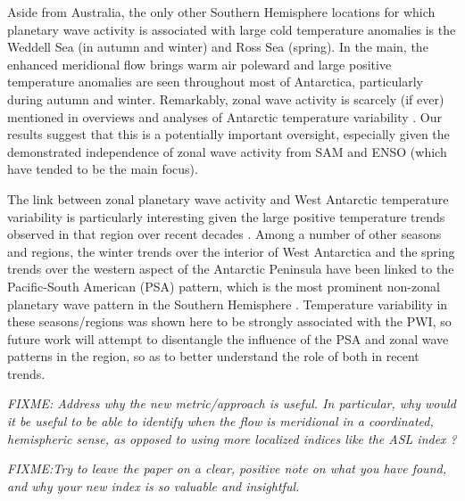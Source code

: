 Aside from Australia, the only other Southern Hemisphere locations for which planetary wave activity is associated with large cold temperature anomalies is the Weddell Sea (in autumn and winter) and Ross Sea (spring). In the main, the enhanced meridional flow brings warm air poleward and large positive temperature anomalies are seen throughout most of Antarctica, particularly during autumn and winter. Remarkably, zonal wave activity is scarcely (if ever) mentioned in overviews and analyses of Antarctic temperature variability \citep[e.g.][]{Russell2010,SchneiderOkumura2012,Yu2012}. Our results suggest that this is a potentially important oversight, especially given the demonstrated independence of zonal wave activity from SAM and ENSO (which have tended to be the main focus).   

The link between zonal planetary wave activity and West Antarctic temperature variability is particularly interesting given the large positive temperature trends observed in that region over recent decades \citep[e.g.][]{Bromwich2013}. Among a number of other seasons and regions, the winter trends over the interior of West Antarctica \citep{Ding2011} and the spring trends over the western aspect of the Antarctic Peninsula \citep{Ding2013} have been linked to the Pacific-South American (PSA) pattern, which is the most prominent non-zonal planetary wave pattern in the Southern Hemisphere \citep[e.g.][]{Mo2001}. Temperature variability in these seasons/regions was shown here to be strongly associated with the PWI, so future work will attempt to disentangle the influence of the PSA and zonal wave patterns in the region, so as to better understand the role of both in recent trends.   

\textit{FIXME: Address why the new metric/approach is useful. In particular, why would it be useful to be able to identify when the flow is meridional in a coordinated, hemispheric sense, as opposed to using more localized indices like the ASL index \citep{Turner2013}?}

\textit{FIXME:Try to leave the paper on a clear, positive note on what you have found, and why your new index is so valuable and insightful.}
